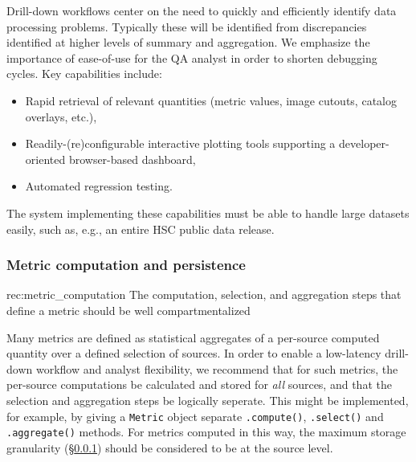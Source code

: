 

Drill-down workflows center on the need to quickly and efficiently identify data processing problems.
Typically these will be identified from discrepancies identified at higher levels of summary and aggregation.
We emphasize the importance of ease-of-use for the QA analyst in order to shorten debugging cycles.
Key capabilities include:

\begin{itemize}
	\item Rapid retrieval of relevant quantities (metric values, image cutouts, catalog overlays, etc.),
	\item Readily-(re)configurable interactive plotting tools supporting a developer-oriented browser-based dashboard,
	\item Automated regression testing.
\end{itemize}

The system implementing these capabilities must be able to handle large datasets easily, such as, e.g., an entire HSC public data release.

\subsubsection{Metric computation and persistence} \label{sec:metric_storage}

\begin{recommendation}
    {rec:metric_computation}
    {The computation, selection, and aggregation steps that define a metric should be well compartmentalized}
\end{recommendation}

Many metrics are defined as statistical aggregates of a per-source computed quantity over a defined selection of sources.
In order to enable a low-latency drill-down workflow and analyst flexibility, we recommend that for such metrics, the per-source computations be calculated and stored for \emph{all} sources, and that the selection and aggregation steps be logically seperate.
This might be implemented, for example, by giving a \texttt{Metric} object separate \texttt{.compute()}, \texttt{.select()} and \texttt{.aggregate()} methods.
For metrics computed in this way, the maximum storage granularity (\S \ref{sec:metric_storage}) should be considered to be at the source level.

